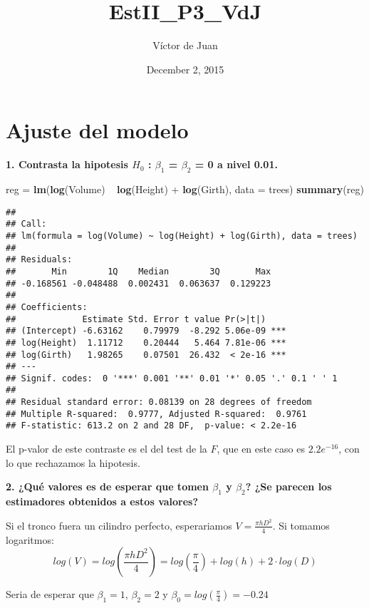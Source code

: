 \documentclass[]{article}
\title{EstII\_P3\_VdJ}
\author{Víctor de Juan}
\date{December 2, 2015}
\newenvironment{Shaded}{\begin{snugshade}}{\end{snugshade}}
\newcommand{\KeywordTok}[1]{\textcolor[rgb]{0.13,0.29,0.53}{\textbf{{#1}}}}
\newcommand{\DataTypeTok}[1]{\textcolor[rgb]{0.13,0.29,0.53}{{#1}}}
\newcommand{\StringTok}[1]{\textcolor[rgb]{0.31,0.60,0.02}{{#1}}}
\newcommand{\NormalTok}[1]{{#1}}
\begin{document}
\maketitle


\section{Ajuste del modelo}

\textbf{1. Contrasta la hipotesis \(H_0\) : \(\beta_1\) = \(\beta_2\) =
0 a nivel 0.01.}

\begin{Shaded}
\begin{Highlighting}[]
\NormalTok{reg =}\StringTok{ }\KeywordTok{lm}\NormalTok{(}\KeywordTok{log}\NormalTok{(Volume) ~}\StringTok{ }\KeywordTok{log}\NormalTok{(Height) +}\StringTok{ }\KeywordTok{log}\NormalTok{(Girth), }\DataTypeTok{data =} \NormalTok{trees)}
\KeywordTok{summary}\NormalTok{(reg)}
\end{Highlighting}
\end{Shaded}

\begin{verbatim}
## 
## Call:
## lm(formula = log(Volume) ~ log(Height) + log(Girth), data = trees)
## 
## Residuals:
##       Min        1Q    Median        3Q       Max 
## -0.168561 -0.048488  0.002431  0.063637  0.129223 
## 
## Coefficients:
##             Estimate Std. Error t value Pr(>|t|)    
## (Intercept) -6.63162    0.79979  -8.292 5.06e-09 ***
## log(Height)  1.11712    0.20444   5.464 7.81e-06 ***
## log(Girth)   1.98265    0.07501  26.432  < 2e-16 ***
## ---
## Signif. codes:  0 '***' 0.001 '**' 0.01 '*' 0.05 '.' 0.1 ' ' 1
## 
## Residual standard error: 0.08139 on 28 degrees of freedom
## Multiple R-squared:  0.9777, Adjusted R-squared:  0.9761 
## F-statistic: 613.2 on 2 and 28 DF,  p-value: < 2.2e-16
\end{verbatim}

El p-valor de este contraste es el del test de la \(F\), que en este
caso es \(2.2 e^{-16}\), con lo que rechazamos la hipotesis.

\textbf{2. ¿Qué valores es de esperar que tomen \(\beta_1\) y
\(\beta_2\)? ¿Se parecen los estimadores obtenidos a estos valores?}

Si el tronco fuera un cilindro perfecto, esperariamos
\(V = \frac{\pi hD^2}{4}\). Si tomamos logaritmos: \[
log(V) = log\left(\frac{\pi h D^2}{4}\right) = log\left(\frac{\pi}{4}\right) + log(h) + 2·log(D)
\]

Seria de esperar que \(\beta_1 = 1\), \(\beta_2 = 2\) y
\(\beta_0 = log\left(\frac{\pi}{4}\right) = -0.24\)
\end{document}
